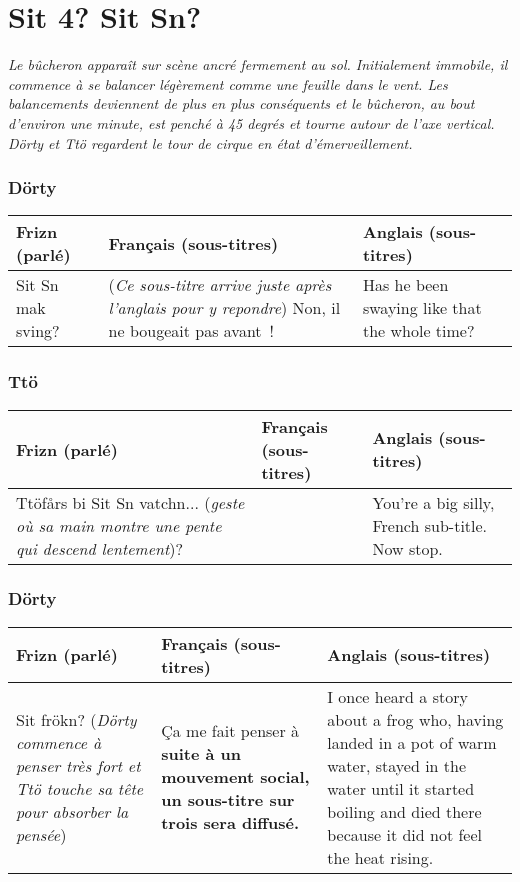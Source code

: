 \chapter*{Sit 4? Sit Sn?}

\emph{Le bûcheron apparaît sur scène ancré fermement au sol. Initialement
immobile, il commence à se balancer légèrement
comme une feuille dans le vent. Les balancements deviennent de plus en plus
conséquents et le bûcheron, au bout d'environ une minute, est penché à 45
degrés et tourne autour de l'axe vertical. Dörty et Ttö regardent le tour de
cirque en état d'émerveillement.}
\subsection*{Dörty}
\begin{tabular}{|p{2in}|p{2in}|p{2in}|}\hline
Frizn (parlé) & Français (sous-titres) & Anglais (sous-titres) \\\hline
Sit Sn mak sving? &
(\emph{Ce sous-titre arrive juste après l'anglais pour y repondre}) Non, il ne bougeait pas avant~! &
Has he been swaying like that the whole time?\\\hline
\end{tabular}\par
\subsection*{Ttö}
\begin{tabular}{|p{2in}|p{2in}|p{2in}|}\hline
Frizn (parlé) & Français (sous-titres) & Anglais (sous-titres) \\\hline
Ttöfårs bi Sit Sn vatchn... (\emph{geste où sa main montre une pente qui descend
lentement})? &
  &
You're a big silly, French sub-title.  Now stop.\\\hline
\end{tabular}\par
\subsection*{Dörty}
\begin{tabular}{|p{2in}|p{2in}|p{2in}|}\hline
Frizn (parlé) & Français (sous-titres) & Anglais (sous-titres) \\\hline
Sit frökn? (\emph{Dörty commence à penser très fort et Ttö touche sa
tête pour absorber la pensée}) &
Ça me fait penser à \textbf{suite à un mouvement social, un sous-titre sur trois
sera diffusé.} &
I once heard a story about a frog who, having landed in a pot of warm water,
stayed in the water until it started boiling and died there because it did
not feel the heat rising.\\\hline
\end{tabular}
